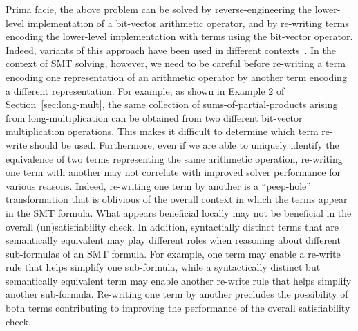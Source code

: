 Prima facie, the above problem can be solved by reverse-engineering
the lower-level implementation of a bit-vector arithmetic operator,
and by re-writing terms encoding the lower-level implementation with
terms using the bit-vector operator.  Indeed, variants of this
approach have been used in different
contexts~\cite{kunz,ciesielski,kolbl,reveng,earlier-pat-match-synopsys}.
In the context of SMT solving, however, we need to be careful%
before re-writing a term encoding one representation of an arithmetic
operator by another term encoding a different representation. For
example, as shown in Example $2$ of Section~\ref{sec:long-mult}, the
same collection of sums-of-partial-products arising from
long-multiplication can be obtained from two different bit-vector
multiplication operations.  This makes it difficult to determine which
term re-write should be used.%
Furthermore, even if we are able to uniquely identify the equivalence
of two terms representing the same arithmetic operation, re-writing
one term with another may not correlate with improved solver
performance for various reasons.  Indeed, re-writing one term by
another is a ``peep-hole'' transformation that is oblivious of the
overall context in which the terms appear in the SMT formula.  What
appears beneficial locally may not be beneficial in the overall
(un)satisfiability check.  In addition, syntactially distinct terms
that are semantically equivalent may play different roles when
reasoning about different sub-formulas of an SMT formula.  For
example, one term may enable a re-write rule that helps simplify one
sub-formula, while a syntactically distinct but semantically
equivalent term may enable another re-write rule that helps simplify
another sub-formula. Re-writing one term by another precludes the
possibility of both terms contributing to improving the performance of
the overall satisfiability check.

